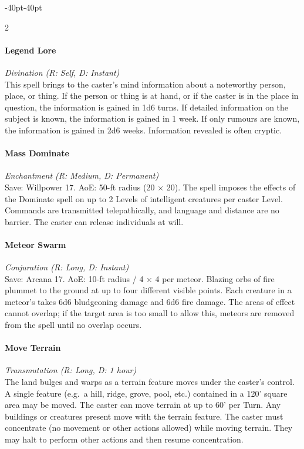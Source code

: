\documentclass{book}
\begin{document}
\begin{adjustwidth}{-40pt}{-40pt}
\begin{multicols}{2}
\paragraph{Legend Lore}\label{legend-lore}

\emph{Divination (R: Self, D: Instant)}\\
This spell brings to the caster's mind information about a noteworthy
person, place, or thing. If the person or thing is at hand, or if the
caster is in the place in question, the information is gained in 1d6
turns. If detailed information on the subject is known, the information
is gained in 1 week. If only rumours are known, the information is
gained in 2d6 weeks. Information revealed is often cryptic.

\paragraph{Mass Dominate}\label{mass-dominate}

\emph{Enchantment (R: Medium, D: Permanent)}\\
Save: Willpower 17. AoE: 50-ft radius (20 × 20). The spell imposes the
effects of the Dominate spell on up to 2 Levels of intelligent creatures
per caster Level. Commands are transmitted telepathically, and language
and distance are no barrier. The caster can release individuals at will.

\paragraph{Meteor Swarm}\label{meteor-swarm}

\emph{Conjuration (R: Long, D: Instant)}\\
Save: Arcana 17. AoE: 10-ft radius / 4 × 4 per meteor. Blazing orbs of
fire plummet to the ground at up to four different visible points. Each
creature in a meteor's takes 6d6 bludgeoning damage and 6d6 fire damage.
The areas of effect cannot overlap; if the target area is too small to
allow this, meteors are removed from the spell until no overlap occurs.

\paragraph{Move Terrain}\label{move-terrain}

\emph{Transmutation (R: Long, D: 1 hour)}\\
The land bulges and warps as a terrain feature moves under the caster's
control. A single feature (e.g.~a hill, ridge, grove, pool, etc.)
contained in a 120' square area may be moved. The caster can move
terrain at up to 60' per Turn. Any buildings or creatures present move
with the terrain feature. The caster must concentrate (no movement or
other actions allowed) while moving terrain. They may halt to perform
other actions and then resume concentration.


\end{multicols}
\end{adjustwidth}
\end{document}
